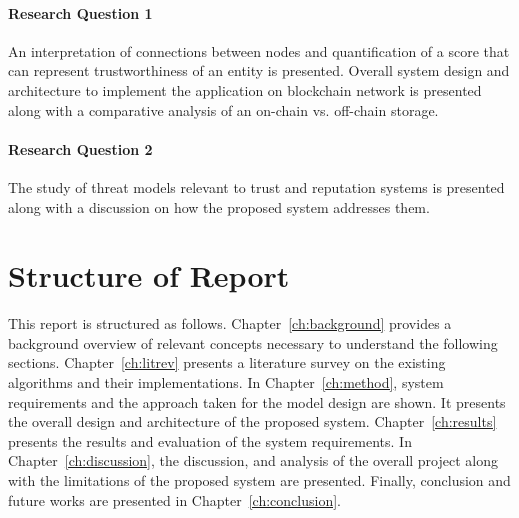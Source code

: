 \paragraph{Research Question 1 } 
An interpretation of connections between nodes and quantification of a score
that can represent trustworthiness of an entity is presented. Overall system
design and architecture to implement the application on blockchain network is
presented along with a comparative analysis of an on-chain vs. off-chain
storage.

\paragraph{Research Question 2} 
The study of threat models relevant to trust and reputation systems is
presented along with a discussion on how the proposed system addresses them. 
%


\section{Structure of Report}
This report is structured as follows. Chapter~\ref{ch:background} provides a
background overview of relevant concepts necessary to understand the following
sections. Chapter~\ref{ch:litrev} presents a literature survey on the existing
algorithms and their implementations. In Chapter~\ref{ch:method}, system
requirements and the approach taken for the model design are shown. It presents
the overall design and architecture of the proposed system.
Chapter~\ref{ch:results} presents the results and evaluation of the system
requirements. In Chapter~\ref{ch:discussion}, the discussion, and analysis of
the overall project along with the limitations of the proposed system are
presented. Finally, conclusion and future works are presented in
Chapter~\ref{ch:conclusion}.
